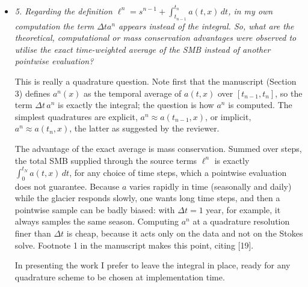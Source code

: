 \documentclass[11pt,reqno]{amsart}
\newcommand{\reply}[2]{%
\medskip
\item \emph{#1}

\medskip
\noindent #2
}
\begin{document}
\begin{itemize}[itemindent=0mm, labelsep=5mm]
{This is context for informally answering the question about ``computational challenges''.  I think it is clear that $h$-refinement for the map-plane mesh is appropriate to resolve the free boundary, especially in a steady state problem.  For time-dependent meshes how to do this is not clear.  For the current non-shallow stress balance I have only been working on extruded 3D meshes (Figure 5 and results in Appendix C).  There is some question of whether the degenerate 3D elements at the glacier margin (the free boundary) could be a stability concern, but instabilities are not evident in my experience.  The low regularity of the surface elevation $s$ solving the VI problem suggests to me that low-order elements should be used for $s_h \approx s$, but there are other efforts suitable to higher-order elements which I have not tried, e.g.~the LVPP framework of Keith, Surowiec, Farrell, Dokken, Papadopoulos and others.  For scalable multigrid solution of VI problems there is my work with Farrell [12].  Regarding some of the concerns for integrating these VI solvers into practical glacier and ice sheet models there is a computational performance model framework given in my work [11]. \par
I hope this is enough to indicate that I take the question seriously.  Computation here has many inter-related aspects, \emph{all} of which need the current theory as a mathematical framework for proper numerical analysis.}

\reply{5. Regarding the definition $\ell^n = s^{n-1} + \int_{t_{n-1}}^{t_n} a(t,x)\,dt$, in my own computation the term $\Delta t a^n$ appears instead of the integral. So, what are the theoretical, computational or mass conservation advantages were observed to utilise the exact time-weighted average of the SMB instead of another pointwise evaluation?}
{This is really a quadrature question.  Note first that the manuscript (Section 3) defines $a^n(x)$ as the temporal average of $a(t,x)$ over $[t_{n-1},t_n]$, so the term $\Delta t\,a^n$ is exactly the integral; the question is how $a^n$ is computed.  The simplest quadratures are explicit, $a^n \approx a(t_{n-1},x)$, or implicit, $a^n \approx a(t_n,x)$, the latter as suggested by the reviewer. \par
The advantage of the exact average is mass conservation.  Summed over steps, the total SMB supplied through the source terms $\ell^n$ is exactly $\int_0^{t_N} a(t,x)\,dt$, for any choice of time steps, which a pointwise evaluation does not guarantee.  Because $a$ varies rapidly in time (seasonally and daily) while the glacier responds slowly, one wants long time steps, and then a pointwise sample can be badly biased: with $\Delta t=1$ year, for example, it always samples the same season.  Computing $a^n$ at a quadrature resolution finer than $\Delta t$ is cheap, because it acts only on the data and not on the Stokes solve.  Footnote 1 in the manuscript makes this point, citing [19]. \par
In presenting the work I prefer to leave the integral in place, ready for any quadrature scheme to be chosen at implementation time.}


\end{itemize}
\end{document}
